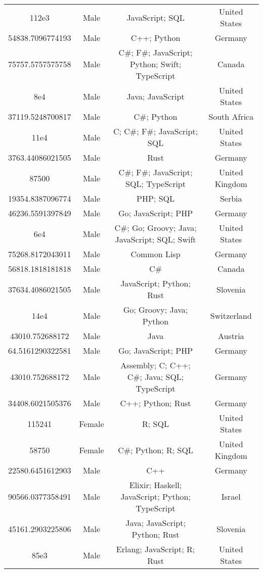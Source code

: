 \begin{center}
\begin{tabular}{ |c|c|c|c| }
112e3  &  Male  &  JavaScript; SQL  &  United States  \\ 
54838.7096774193  &  Male  &  C++; Python  &  Germany  \\ 
75757.5757575758  &  Male  &  C\#; F\#; JavaScript; Python; Swift; TypeScript  &  Canada  \\ 
8e4  &  Male  &  Java; JavaScript  &  United States  \\ 
37119.5248700817  &  Male  &  C\#; Python  &  South Africa  \\ 
11e4  &  Male  &  C; C\#; F\#; JavaScript; SQL  &  United States  \\ 
3763.44086021505  &  Male  &  Rust  &  Germany  \\ 
87500  &  Male  &  C\#; F\#; JavaScript; SQL; TypeScript  &  United Kingdom  \\ 
19354.8387096774  &  Male  &  PHP; SQL  &  Serbia  \\ 
46236.5591397849  &  Male  &  Go; JavaScript; PHP  &  Germany  \\ 
6e4  &  Male  &  C\#; Go; Groovy; Java; JavaScript; SQL; Swift  &  United States  \\ 
75268.8172043011  &  Male  &  Common Lisp  &  Germany  \\ 
56818.1818181818  &  Male  &  C\#  &  Canada  \\ 
37634.4086021505  &  Male  &  JavaScript; Python; Rust  &  Slovenia  \\ 
14e4  &  Male  &  Go; Groovy; Java; Python  &  Switzerland  \\ 
43010.752688172  &  Male  &  Java  &  Austria  \\ 
64.5161290322581  &  Male  &  Go; JavaScript; PHP  &  Germany  \\ 
43010.752688172  &  Male  &  Assembly; C; C++; C\#; Java; SQL; TypeScript  &  Germany  \\ 
34408.6021505376  &  Male  &  C++; Python; Rust  &  Germany  \\ 
115241  &  Female  &  R; SQL  &  United States  \\ 
58750  &  Female  &  C\#; Python; R; SQL  &  United Kingdom  \\ 
22580.6451612903  &  Male  &  C++  &  Germany  \\ 
90566.0377358491  &  Male  &  Elixir; Haskell; JavaScript; Python; TypeScript  &  Israel  \\ 
45161.2903225806  &  Male  &  Java; JavaScript; Python; Rust  &  Slovenia  \\ 
85e3  &  Male  &  Erlang; JavaScript; R; Rust  &  United States  \\ 

\end{tabular}
\end{center}

